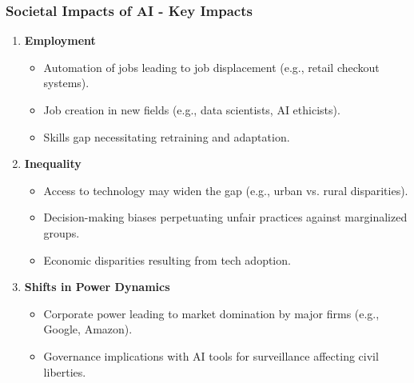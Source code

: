 \documentclass{beamer}
\begin{document}
\begin{frame}[fragile]
    \frametitle{Societal Impacts of AI - Key Impacts}
    \begin{enumerate}
        \item \textbf{Employment}
        \begin{itemize}
            \item Automation of jobs leading to job displacement (e.g., retail checkout systems).
            \item Job creation in new fields (e.g., data scientists, AI ethicists).
            \item Skills gap necessitating retraining and adaptation.
        \end{itemize}
        
        \item \textbf{Inequality}
        \begin{itemize}
            \item Access to technology may widen the gap (e.g., urban vs. rural disparities).
            \item Decision-making biases perpetuating unfair practices against marginalized groups.
            \item Economic disparities resulting from tech adoption.
        \end{itemize}
        
        \item \textbf{Shifts in Power Dynamics}
        \begin{itemize}
            \item Corporate power leading to market domination by major firms (e.g., Google, Amazon).
            \item Governance implications with AI tools for surveillance affecting civil liberties.
        \end{itemize}
    \end{enumerate}
\end{frame}
\end{document}
